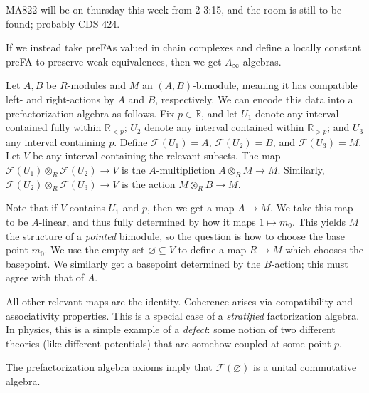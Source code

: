 
MA822 will be on thursday this week from 2-3:15, and the room is still to be found; probably CDS 424.

\begin{remark}\label{3.1.5}
	If we instead take preFAs valued in chain complexes and define a locally constant preFA to preserve weak equivalences, then we get $A_\infty $-algebras.
\end{remark}

\begin{example}\label{3.1.6}
	Let $A,B$ be $R$-modules and $M$ an $(A,B)$-bimodule, meaning it has compatible left- and right-actions by $A$ and $B$, respectively. We can encode this data into a prefactorization algebra as follows. Fix $p\in\mathbb{R} $, and let $U_1$ denote any interval contained fully within $\mathbb{R} _{<p} $; $U_2$ denote any interval contained within $\mathbb{R} _{>p} $; and $U_3$ any interval containing $p$. Define $\mathcal{F}  (U_1)=A$, $\mathcal{F} (U_2)=B$, and $\mathcal{F} (U_3)=M$. Let $V$ be any interval containing the relevant subsets. The map $\mathcal{F} (U_1)\otimes_R \mathcal{F} (U_2)\to V$ is the $A$-multipliction $A\otimes_R M\to M$. Similarly, $\mathcal{F} (U_2)\otimes_R \mathcal{F} (U_3)\to V$ is the action $M\otimes_R B\to M$.

	Note that if $V$ contains $U_1$ and $p$, then we get a map $A\to M$. We take this map to be $A$-linear, and thus fully determined by how it maps $1\mapsto m_0$. This yields $M$ the structure of a \emph{pointed} bimodule, so the question is how to choose the base point $m_0$. We use the empty set $\varnothing \subseteq V$ to define a map $R\to M$ which chooses the basepoint. We similarly get a basepoint determined by the $B$-action; this must agree with that of $A$.

	All other relevant maps are the identity. Coherence arises via compatibility and associativity properties. This is a special case of a \emph{stratified} factorization algebra. In physics, this is a simple example of a \emph{defect}: some notion of two different theories (like different potentials) that are somehow coupled at some point $p$.
\end{example}


\begin{remark}\label{3.1.7}
	The prefactorization algebra axioms imply that $\mathcal{F} (\varnothing )$ is a unital commutative algebra.
\end{remark}


